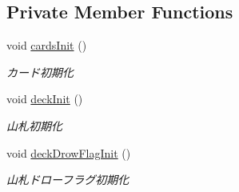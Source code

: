 \subsection*{Private Member Functions}
\begin{DoxyCompactItemize}
\item 
void \hyperlink{classjp_1_1gr_1_1java__conf_1_1yuta__yoshinaga_1_1java__trumpcards_1_1_trump_cards_a8e8a4cda3a952cb6a295274765240808}{cards\+Init} ()
\begin{DoxyCompactList}\small\item\em カード初期化 \end{DoxyCompactList}\item 
void \hyperlink{classjp_1_1gr_1_1java__conf_1_1yuta__yoshinaga_1_1java__trumpcards_1_1_trump_cards_af1a1d8299e1e79a272351c9e4b4026fa}{deck\+Init} ()
\begin{DoxyCompactList}\small\item\em 山札初期化 \end{DoxyCompactList}\item 
void \hyperlink{classjp_1_1gr_1_1java__conf_1_1yuta__yoshinaga_1_1java__trumpcards_1_1_trump_cards_aa1db686e11e2c281976505d527eaffbd}{deck\+Drow\+Flag\+Init} ()
\begin{DoxyCompactList}\small\item\em 山札ドローフラグ初期化 \end{DoxyCompactList}\end{DoxyCompactItemize}
